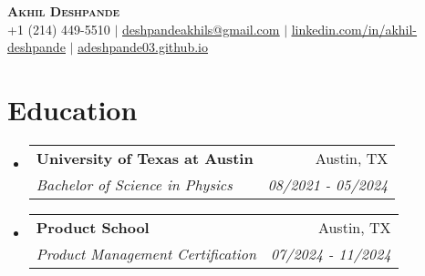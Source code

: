 \documentclass[letterpaper]{article}
\makeatletter
\newcommand{\resumeSubheading}[4]{
  \vspace{-2pt}\item
    \begin{tabular*}{0.97\textwidth}[t]{l@{\extracolsep{\fill}}r}
      \textbf{#1} & #2 \\
      \textit{\small#3} & \textit{\small #4} \\
    \end{tabular*}\vspace{-7pt}
}
\newcommand{\resumeSubHeadingListStart}{\begin{itemize}[leftmargin=0.15in, label={}]}
\newcommand{\resumeSubHeadingListEnd}{\end{itemize}}
\makeatother
\begin{document}

\begin{center}
    \textbf{\Huge \scshape Akhil Deshpande} \\ \vspace{1pt}
    \small +1 (214) 449-5510 $|$ \href{deshpandeakhils@gmail.com}{\underline{deshpandeakhils@gmail.com}} $|$ 
    \href{https://www.linkedin.com/in/akhil-deshpande/}{\underline{linkedin.com/in/akhil-deshpande}} $|$
    \href{https://adeshpande03.github.io}{\underline{adeshpande03.github.io}}
\end{center}


\section{Education}
  \resumeSubHeadingListStart
    \resumeSubheading
      {University of Texas at Austin}{Austin, TX}
      {Bachelor of Science in Physics}{08/2021 - 05/2024}
      
      \resumeSubheading
      {Product School}{Austin, TX}
      {Product Management Certification}{07/2024 - 11/2024}
  \resumeSubHeadingListEnd
\end{document}
